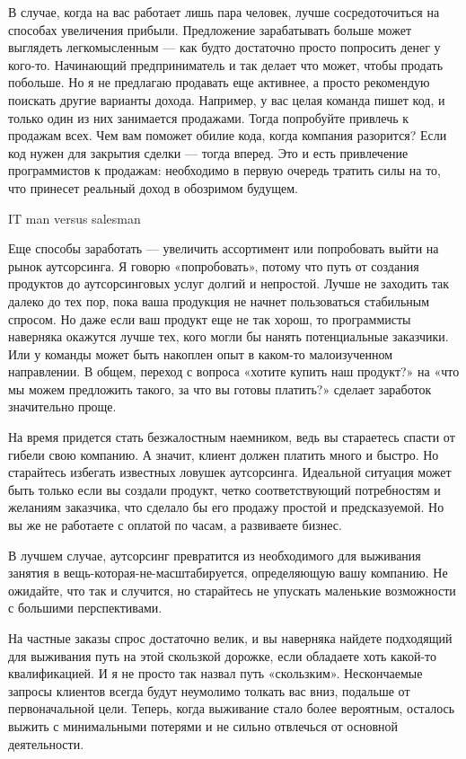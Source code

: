 \documentclass[ebook,12pt,oneside,openany]{memoir}
\begin{document}
В случае, когда на вас работает лишь пара человек, лучше
сосредоточиться на способах увеличения прибыли. Предложение
зарабатывать больше может выглядеть легкомысленным — как будто
достаточно просто попросить денег у кого-то. Начинающий
предприниматель и так делает что может, чтобы продать побольше. Но я
не предлагаю продавать еще активнее, а просто рекомендую поискать
другие варианты дохода. Например, у вас целая команда пишет код, и
только один из них занимается продажами. Тогда попробуйте привлечь к
продажам всех. Чем вам поможет обилие кода, когда компания разорится?
Если код нужен для закрытия сделки — тогда вперед. Это и есть
привлечение программистов к продажам: необходимо в первую очередь
тратить силы на то, что принесет реальный доход в обозримом будущем.

IT man versus salesman


Еще способы заработать — увеличить ассортимент или попробовать выйти
на рынок аутсорсинга. Я говорю «попробовать», потому что путь от
создания продуктов до аутсорсинговых услуг долгий и непростой. Лучше
не заходить так далеко до тех пор, пока ваша продукция не начнет
пользоваться стабильным спросом. Но даже если ваш продукт еще не так
хорош, то программисты наверняка окажутся лучше тех, кого могли бы
нанять потенциальные заказчики. Или у команды может быть накоплен опыт
в каком-то малоизученном направлении. В общем, переход с вопроса
«хотите купить наш продукт?» на «что мы можем предложить такого, за
что вы готовы платить?» сделает заработок значительно проще.

На время придется стать безжалостным наемником, ведь вы стараетесь
спасти от гибели свою компанию. А значит, клиент должен платить много
и быстро. Но старайтесь избегать известных ловушек аутсорсинга.
Идеальной ситуация может быть только если вы создали продукт, четко
соответствующий потребностям и желаниям заказчика, что сделало бы его
продажу простой и предсказуемой. Но вы же не работаете с оплатой по
часам, а развиваете бизнес.

В лучшем случае, аутсорсинг превратится из необходимого для выживания
занятия в вещь-которая-не-масштабируется, определяющую вашу компанию.
Не ожидайте, что так и случится, но старайтесь не упускать маленькие
возможности с большими перспективами.

На частные заказы спрос достаточно велик, и вы наверняка найдете
подходящий для выживания путь на этой скользкой дорожке, если
обладаете хоть какой-то квалификацией. И я не просто так назвал путь
«скользким». Нескончаемые запросы клиентов всегда будут неумолимо
толкать вас вниз, подальше от первоначальной цели. Теперь, когда
выживание стало более вероятным, осталось выжить с минимальными
потерями и не сильно отвлечься от основной деятельности.
\end{document}
